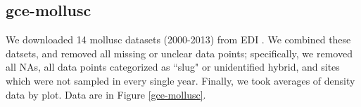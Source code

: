 \documentclass[11pt, oneside]{article}
\begin{document}
\subsection {gce-mollusc}
We downloaded 14 mollusc datasets (2000-2013) from EDI \citep{project_mollusc_2014,project_mollusc_2014-3, project_mollusc_2014-12, project_mollusc_2014-2,project_mollusc_2014-1,   project_mollusc_2014-4, project_mollusc_2014-5, project_mollusc_2014-6, project_mollusc_2014-7, project_mollusc_2014-8, project_mollusc_2014-9, project_mollusc_2014-10, project_mollusc_2014-11,  project_mollusc_2014-13}. We combined these datsets, and removed all missing or unclear data points; specifically, we removed all NAs, all data points categorized as ``slug" or unidentified hybrid, and sites which were not sampled in every single year. Finally, we took averages of density data by plot. %
Data are in Figure \ref{gce-mollusc}.
\end{document}
